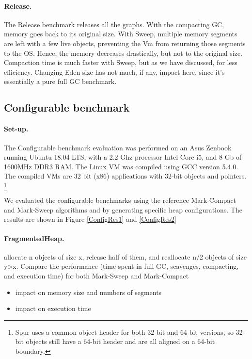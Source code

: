 \documentclass[10pt, sigplan]{acmart}
\begin{document}
\paragraph{Release.} The Release benchmark releases all the graphs. With the compacting GC, memory goes back to its original size. With Sweep, multiple memory segments are left with a few live objects, preventing the Vm from returning those segments to the OS. Hence, the memory decreases drastically, but not to the original size. Compaction time is much faster with Sweep, but as we have discussed, for less efficiency. Changing Eden size has not much, if any, impact here, since it's essentially a pure full GC benchmark.

\subsection{Configurable benchmark}



\paragraph{Set-up.}The Configurable benchmark evaluation was performed on an Asus Zenbook running Ubuntu 18.04 LTS, with a 2.2 Ghz processor Intel Core i5, and 8 Gb of 1600MHz DDR3 RAM. The Linux VM was compiled using GCC version 5.4.0. The compiled VMs are 32 bit (x86) applications with 32-bit objects and pointers. \footnote{Spur uses a common object header for both 32-bit and 64-bit versions, so 32-bit objects still have a 64-bit header and are all aligned on a 64-bit boundary.}


We evaluated the configurable benchmarks using the reference Mark-Compact and Mark-Sweep algorithms and by generating specific heap configurations. 
The results are shown in Figure \ref{ConfigRes1} and \ref{ConfigRes2}

\paragraph{FragmentedHeap.} 
allocate n objects of size x, release half of them, and reallocate n/2 objects of size y>x. Compare the performance (time spent in full GC, scavenges, compacting, and execution time) for both Mark-Sweep and Mark-Compact
\begin{itemize}
\item impact on memory size and numbers of segments
\item impact on execution time 
\end{itemize}
\end{document}
